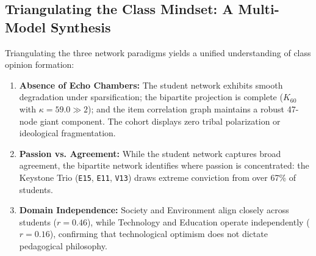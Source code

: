 \documentclass[10pt, a4paper]{article}
\begin{document}
\subsection{Triangulating the Class Mindset: A Multi-Model Synthesis}
Triangulating the three network paradigms yields a unified understanding of class opinion formation:
\begin{enumerate}
    \setlength{\itemsep}{0pt}
    \item \textbf{Absence of Echo Chambers:} The student network exhibits smooth degradation under sparsification; the bipartite projection is complete ($K_{60}$ with $\kappa = 59.0 \gg 2$); and the item correlation graph maintains a robust 47-node giant component. The cohort displays zero tribal polarization or ideological fragmentation.
    \item \textbf{Passion vs. Agreement:} While the student network captures broad agreement, the bipartite network identifies where passion is concentrated: the Keystone Trio (\texttt{E15}, \texttt{E11}, \texttt{V13}) draws extreme conviction from over 67\% of students.
    \item \textbf{Domain Independence:} Society and Environment align closely across students ($r = 0.46$), while Technology and Education operate independently ($r = 0.16$), confirming that technological optimism does not dictate pedagogical philosophy.
\end{enumerate}
\end{document}
